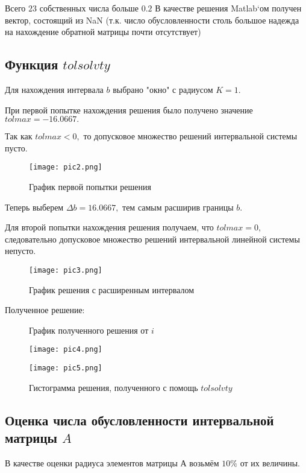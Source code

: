 \documentclass[a4]{article}
\begin{document}
Всего $23$ собственных числа больше $0.2$
В качестве решения Matlab`ом получен вектор, состоящий из NaN (т.к. число обусловленности столь большое надежда на нахождение обратной матрицы почти отсутствует)

\subsection{Функция $tolsolvty$}
Для нахождения интервала $b$ выбрано "окно" с радиусом $K=1.$

При первой попытке нахождения решения было получено значение $tolmax = -16.0667.$

Так как $tolmax < 0,$ то допусковое множество решений интервальной системы пусто.

\begin{figure}[H]
\begin{center}
\caption{График первой попытки решения}
\texttt{[image: pic2.png]} 
\end{center}
\end{figure}


Теперь выберем $\Delta b = 16.0667,$ тем самым расширив границы $b.$

Для второй попытки нахождения решения получаем, что $tolmax=0,$ следовательно допусковое множество решений интервальной линейной системы непусто.

\begin{figure}[H]
\begin{center}
\caption{График решения с расширенным интервалом}
\texttt{[image: pic3.png]} 
\end{center}
\end{figure}

Полученное решение:

\begin{figure}[H]
\begin{center}
\caption{График полученного решения от $i$}
\texttt{[image: pic4.png]} 

\caption{Гистограмма решения, полученного с помощь $tolsolvty$}
\texttt{[image: pic5.png]} 
\end{center}
\end{figure}

\subsection{Оценка числа обусловленности интервальной матрицы $A$}

В качестве оценки радиуса элементов матрицы $А$ возьмём $10\%$ от их величины.
\end{document}
